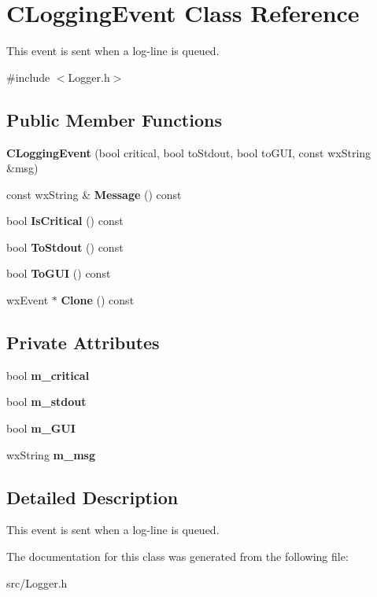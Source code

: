 \section{CLoggingEvent Class Reference}
\label{classCLoggingEvent}


This event is sent when a log-\/line is queued.  


{\ttfamily \#include $<$Logger.h$>$}\subsection*{Public Member Functions}
\begin{DoxyCompactItemize}
\item 
{\bfseries CLoggingEvent} (bool critical, bool toStdout, bool toGUI, const wxString \&msg)\label{classCLoggingEvent_a407dde9a0bbb9286ce38011876f312ea}

\item 
const wxString \& {\bfseries Message} () const \label{classCLoggingEvent_a9e132d85a9099d326bffe797b3ccc250}

\item 
bool {\bfseries IsCritical} () const \label{classCLoggingEvent_a5418d34b7d3b910c0f783fe9a665e9f2}

\item 
bool {\bfseries ToStdout} () const \label{classCLoggingEvent_a9d091e9f01fbe204b3e9a24ba8526d58}

\item 
bool {\bfseries ToGUI} () const \label{classCLoggingEvent_a670de88f64d5df8cf4012a0839fa7059}

\item 
wxEvent $\ast$ {\bfseries Clone} () const \label{classCLoggingEvent_aea0361c9e9a90d710ec212142559401b}

\end{DoxyCompactItemize}
\subsection*{Private Attributes}
\begin{DoxyCompactItemize}
\item 
bool {\bfseries m\_\-critical}\label{classCLoggingEvent_a635781fdd3d07cc98547b37d9d1ea60d}

\item 
bool {\bfseries m\_\-stdout}\label{classCLoggingEvent_a2ca75035e3c3794a7a18b3efb29f85ab}

\item 
bool {\bfseries m\_\-GUI}\label{classCLoggingEvent_a838f85b7a34ba9da3e55cd5163a42195}

\item 
wxString {\bfseries m\_\-msg}\label{classCLoggingEvent_a1b804d5de4decb32a3f821a7db312adc}

\end{DoxyCompactItemize}


\subsection{Detailed Description}
This event is sent when a log-\/line is queued. 

The documentation for this class was generated from the following file:\begin{DoxyCompactItemize}
\item 
src/Logger.h\end{DoxyCompactItemize}
